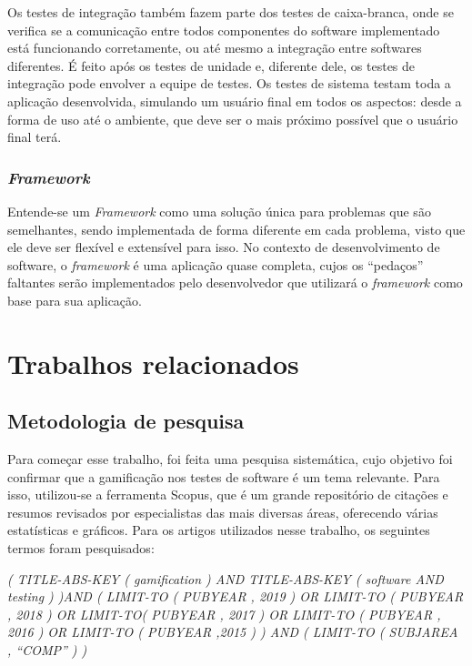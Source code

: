 \documentclass[twoside,english,brazilian]{UNISINOSartigo}
\begin{document}
Os testes de integração também fazem parte dos testes de caixa-branca, onde se verifica se a comunicação entre todos componentes do software implementado está funcionando corretamente, ou até mesmo a integração entre softwares diferentes. É feito após os testes de unidade e, diferente dele, os testes de integração pode envolver a equipe de testes. Os testes de sistema testam toda a aplicação desenvolvida, simulando um usuário final em todos os aspectos: desde a forma de uso até o ambiente, que deve ser o mais próximo possível que o usuário final terá.


\subsubsection{\textit{Framework}}

Entende-se um \textit{Framework} como uma solução única para problemas que são semelhantes, sendo implementada de forma diferente em cada problema, visto que ele deve ser flexível e extensível para isso. No contexto de desenvolvimento de software, o \textit{framework} é uma aplicação quase completa, cujos os ``pedaços'' faltantes serão implementados pelo desenvolvedor que utilizará o \textit{framework} como base para sua aplicação. \cite{ufcg}


\section{Trabalhos relacionados}

\subsection{Metodologia de pesquisa}

Para come\c{c}ar esse trabalho, foi feita uma pesquisa sistem\'{a}tica, cujo objetivo foi confirmar que a gamifica\c{c}\~{a}o nos testes de software \'{e} um tema relevante. Para isso, utilizou-se a ferramenta Scopus, que \'{e} um grande reposit\'{o}rio de cita\c{c}\~{o}es e resumos revisados por especialistas das mais diversas \'{a}reas, oferecendo  v\'{a}rias estat\'{i}sticas e gr\'{a}ficos. Para os artigos utilizados nesse trabalho, os seguintes termos foram pesquisados:

\textit{( TITLE-ABS-KEY ( gamification ) AND TITLE-ABS-KEY ( software AND testing ) )AND ( LIMIT-TO ( PUBYEAR , 2019 ) OR LIMIT-TO ( PUBYEAR , 2018 ) OR LIMIT-TO( PUBYEAR , 2017 ) OR LIMIT-TO ( PUBYEAR , 2016 ) OR LIMIT-TO ( PUBYEAR ,2015 ) ) AND ( LIMIT-TO ( SUBJAREA , ``COMP'' ) )}
\end{document}
